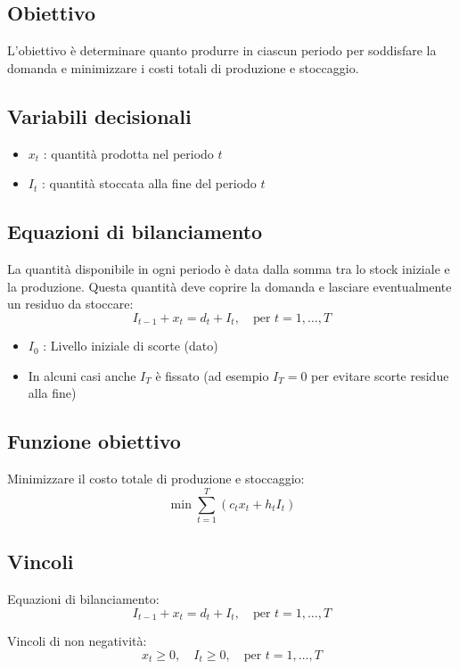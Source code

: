 \subsection{Obiettivo}
L'obiettivo è determinare quanto produrre in ciascun periodo per soddisfare la domanda e minimizzare i costi totali di produzione e stoccaggio.

\subsection{Variabili decisionali}
\begin{itemize}
    \item $x_t$ : quantità prodotta nel periodo $t$
    \item $I_t$ : quantità stoccata alla fine del periodo $t$
\end{itemize}

\subsection{Equazioni di bilanciamento}
La quantità disponibile in ogni periodo è data dalla somma tra lo stock iniziale e la produzione. 
Questa quantità deve coprire la domanda e lasciare eventualmente un residuo da stoccare:
\[ 
I_{t-1} + x_t = d_t + I_t, \quad \text{per } t = 1, \dots, T
\]

\begin{itemize}
    \item $I_0$ : Livello iniziale di scorte (dato)
    \item In alcuni casi anche $I_T$ è fissato (ad esempio $I_T=0$ per evitare scorte residue alla fine)
\end{itemize}

\subsection{Funzione obiettivo}
Minimizzare il costo totale di produzione e stoccaggio:
\[ 
\min \sum_{t=1}^{T} \left( c_t x_t + h_t I_t \right)
\]

\subsection{Vincoli}

Equazioni di bilanciamento:
\[ 
I_{t-1} + x_t = d_t + I_t, \quad \text{per } t = 1, \dots, T
\]

Vincoli di non negatività:
\[ 
x_t \geq 0, \quad I_t \geq 0, \quad \text{per } t = 1, \dots, T
\]

